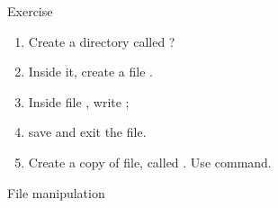 \begin{frame}{Exercise}

	\begin{enumerate}
		\item<1-> Create a directory called ?
		\item<2-> Inside it, create a file .
		\item<3-> Inside file , write ;
		\item<4-> save and exit the file.
		\item<3-> Create a copy of  file, called . Use  command.
	\end{enumerate}
	
\end{frame}

\begin{frame}{File manipulation}

\end{frame}